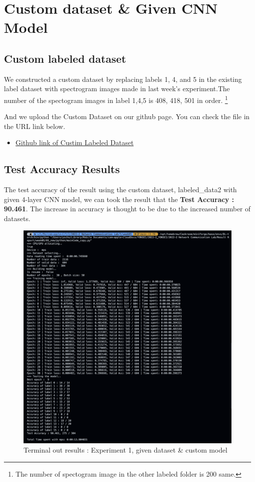 \section{Custom dataset \& Given CNN Model}
\subsection{Custom labeled dataset}
We constructed a custom dataset by replacing labels 1, 4, and 5 in the existing label dataset with spectrogram images made in last week's experiment.The number of the spectogram images in label 1,4,5 is 408, 418, 501 in order. \footnote{The number of spectogram image in the other labeled folder is 200 same.}

And we upload the Custom Dataset on our github page. You can check the file in the URL link below.
\begin{itemize}
\item \href{https://github.com/CHOyunshin/2022-2-Network-Experiments/tree/main/Result%20Report/week05/01_new/labeled_data2}{Github link of Custim Labeled Dataset}
\end{itemize}

\subsection{Test Accuracy Results}
The test accuracy of the result using the custom dataset, labeled\_data2 with given 4-layer CNN model, we can took the result that the \textbf{Test Accuracy : 90.461}.
The increase in accuracy is thought to be due to the increased number of datasets.\\
    \vspace{-4mm}  
    \begin{figure}[!h]\centering 
		\includegraphics[width=.95\textwidth]{image/week05/2-1.png}
		\caption{\footnotesize 
		Terminal out results : Experiment 1, given dataset \& custom model}
		\vspace{-10pt}
    \end{figure}
\clearpage